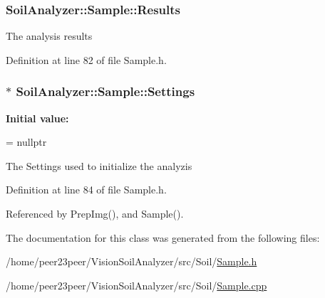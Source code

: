 \subsubsection[{Results}]{ Soil\+Analyzer\+::\+Sample\+::\+Results}\label{class_soil_analyzer_1_1_sample_ab242ae1c2f229168fd630a9f31d7237f}
The analysis results 

Definition at line 82 of file Sample.\+h.

\hypertarget{class_soil_analyzer_1_1_sample_a31f7b29fc46497f9b2847285c7893832}{}
\subsubsection[{Settings}]{$\ast$ Soil\+Analyzer\+::\+Sample\+::\+Settings}\label{class_soil_analyzer_1_1_sample_a31f7b29fc46497f9b2847285c7893832}
{\bfseries Initial value\+:}
\begin{DoxyCode}
=
      \textcolor{keyword}{nullptr}
\end{DoxyCode}
The Settings used to initialize the analyzis 

Definition at line 84 of file Sample.\+h.



Referenced by Prep\+Img(), and Sample().



The documentation for this class was generated from the following files\+:\begin{DoxyCompactItemize}
\item 
/home/peer23peer/\+Vision\+Soil\+Analyzer/src/\+Soil/\hyperlink{_sample_8h}{Sample.\+h}\item 
/home/peer23peer/\+Vision\+Soil\+Analyzer/src/\+Soil/\hyperlink{_sample_8cpp}{Sample.\+cpp}\end{DoxyCompactItemize}
